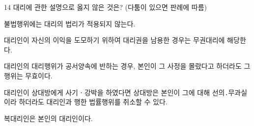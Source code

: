 \begin{question}{14}
대리에 관한 설명으로 옳지 않은 것은? (다툼이 있으면 판례에 따름)
\begin{choices}
  \item 불법행위에는 대리의 법리가 적용되지 않는다.
  \item 대리인이 자신의 이익을 도모하기 위하여 대리권을 남용한 경우는 무권대리에 해당한다.
  \item 대리인의 대리행위가 공서양속에 반하는 경우, 본인이 그 사정을 몰랐다고 하더라도 그 행위는 무효이다.
  \item 대리인이 상대방에게 사기ㆍ강박을 하였다면 상대방은 본인이 그에 대해 선의․무과실이라 하더라도 대리인과 행한 법률행위를 취소할 수 있다.
  \item 복대리인은 본인의 대리인이다.
\end{choices}
\end{question}
